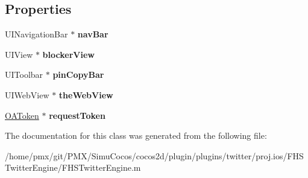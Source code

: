 \subsection*{Properties}
\begin{DoxyCompactItemize}
\item 
\mbox{\label{interfaceFHSTwitterEngineController_a2008c065b4445ffb34e9c9ef197fa633}} 
U\+I\+Navigation\+Bar $\ast$ {\bfseries nav\+Bar}
\item 
\mbox{\label{interfaceFHSTwitterEngineController_a9c45600415cbff851167303954fa346f}} 
U\+I\+View $\ast$ {\bfseries blocker\+View}
\item 
\mbox{\label{interfaceFHSTwitterEngineController_a81cf9d111dabcb2a4a88282e55580cdf}} 
U\+I\+Toolbar $\ast$ {\bfseries pin\+Copy\+Bar}
\item 
\mbox{\label{interfaceFHSTwitterEngineController_abb8efd99d2a87bfad5057fb90db27357}} 
U\+I\+Web\+View $\ast$ {\bfseries the\+Web\+View}
\item 
\mbox{\label{interfaceFHSTwitterEngineController_ab2dd0447e5f97c1fa2fdf3df2319e357}} 
\hyperlink{interfaceOAToken}{O\+A\+Token} $\ast$ {\bfseries request\+Token}
\end{DoxyCompactItemize}


The documentation for this class was generated from the following file\+:\begin{DoxyCompactItemize}
\item 
/home/pmx/git/\+P\+M\+X/\+Simu\+Cocos/cocos2d/plugin/plugins/twitter/proj.\+ios/\+F\+H\+S\+Twitter\+Engine/F\+H\+S\+Twitter\+Engine.\+m\end{DoxyCompactItemize}
